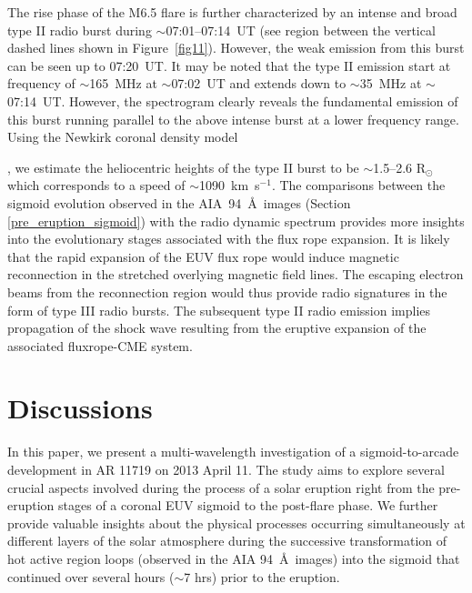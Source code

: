 \documentclass[twocolumn]{aastex6}
\begin{document}
The rise phase of the M6.5 flare is further characterized by an intense and broad type II radio burst during $\sim$07:01--07:14~UT (see region between the vertical dashed lines shown in Figure~\ref{fig11}). However, the weak emission from this burst can be seen up to 07:20~UT. It may be noted that the type II emission start at frequency of $\sim$165~MHz at $\sim$07:02~UT and extends down to $\sim$35~MHz at $\sim$07:14~UT. However, the spectrogram clearly reveals the fundamental emission of this burst running parallel to the above intense burst at a lower frequency range. Using the Newkirk coronal density model {\citep{Newkirk1961}, we estimate the heliocentric heights of the type II burst to be $\sim$1.5--2.6 R$ _{\odot}$ which corresponds to a speed of $\sim$1090~km~s$^{-1}$. The comparisons between the sigmoid evolution observed in the AIA~94~\AA~images (Section \ref{pre_eruption_sigmoid}) with the radio dynamic spectrum provides more insights into the evolutionary stages associated with the flux rope expansion. It is likely that the rapid expansion of the EUV flux rope would induce magnetic reconnection in the stretched overlying magnetic field lines. The escaping electron beams from the reconnection region would thus provide radio signatures in the form of type III radio bursts. The subsequent type II radio emission implies propagation of the shock wave resulting from the eruptive expansion of the associated fluxrope-CME system. 

\section{Discussions}   
\label{sec_discuss}    

\begin{figure*}
\caption{Dynamic radio spectrum recorded by the HiRAS spectrograph from 25 to 2500 MHz showing a wide range of radio activities associated with the M6.5 flare/CME event on 11 April 2013. Two vertical dashed lines indicate the start and end timings of type II radio burst considered for the calculation of its speed.}
\label{fig11}
\end{figure*}
      
In this paper, we present a multi-wavelength investigation of a sigmoid-to-arcade development in AR 11719 on 2013 April 11. The study aims to explore several crucial aspects involved during the process of a solar eruption right from the pre-eruption stages of a coronal EUV sigmoid to the post-flare phase. We further provide valuable insights about the physical processes occurring simultaneously at different layers of the solar atmosphere during the successive transformation of hot active region loops (observed in the AIA 94~\AA~images) into the sigmoid that continued over several hours ($\sim$7 hrs) prior to the eruption. 

}
\end{document}
